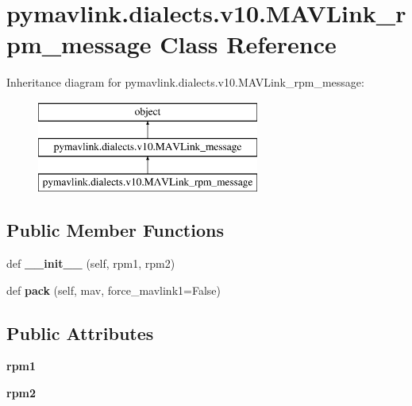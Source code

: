\hypertarget{classpymavlink_1_1dialects_1_1v10_1_1MAVLink__rpm__message}{}\section{pymavlink.\+dialects.\+v10.\+M\+A\+V\+Link\+\_\+rpm\+\_\+message Class Reference}
\label{classpymavlink_1_1dialects_1_1v10_1_1MAVLink__rpm__message}
Inheritance diagram for pymavlink.\+dialects.\+v10.\+M\+A\+V\+Link\+\_\+rpm\+\_\+message\+:\begin{figure}[H]
\begin{center}
\leavevmode
\includegraphics[height=3.000000cm]{classpymavlink_1_1dialects_1_1v10_1_1MAVLink__rpm__message}
\end{center}
\end{figure}
\subsection*{Public Member Functions}
\begin{DoxyCompactItemize}
\item 
\mbox{\label{classpymavlink_1_1dialects_1_1v10_1_1MAVLink__rpm__message_a58844067c11c3ad9687dbf64fa382e79}} 
def {\bfseries \+\_\+\+\_\+init\+\_\+\+\_\+} (self, rpm1, rpm2)
\item 
\mbox{\label{classpymavlink_1_1dialects_1_1v10_1_1MAVLink__rpm__message_a208029b4337b463b87af59b80669ebc1}} 
def {\bfseries pack} (self, mav, force\+\_\+mavlink1=False)
\end{DoxyCompactItemize}
\subsection*{Public Attributes}
\begin{DoxyCompactItemize}
\item 
\mbox{\label{classpymavlink_1_1dialects_1_1v10_1_1MAVLink__rpm__message_a9b04810af676d324844e8a39b2d27bda}} 
{\bfseries rpm1}
\item 
\mbox{\label{classpymavlink_1_1dialects_1_1v10_1_1MAVLink__rpm__message_adac5010fc96cbfddc5a4d0d56ecb15aa}} 
{\bfseries rpm2}
\end{DoxyCompactItemize}

